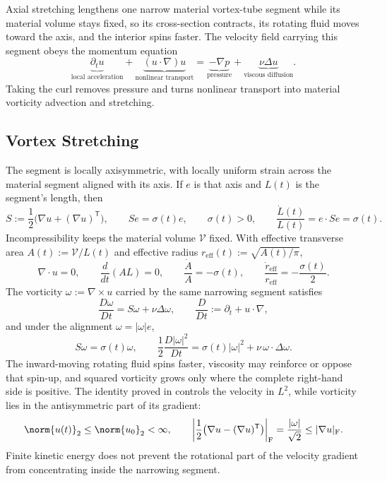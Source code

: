 
Axial stretching lengthens one narrow material vortex-tube segment while its material volume stays fixed, so its cross-section contracts, its rotating fluid moves toward the axis, and the interior spins faster. The velocity field carrying this segment obeys the momentum equation
\[
  \underbrace{\partial_t u}_{\text{local acceleration}}
  +
  \underbrace{(u\cdot\nabla)u}_{\text{nonlinear transport}}
  =
  \underbrace{-\nabla p}_{\text{pressure}}
  +
  \underbrace{\nu\Delta u}_{\text{viscous diffusion}}.
\]
Taking the curl removes pressure and turns nonlinear transport into material vorticity advection and stretching.

\subsection{Vortex Stretching}\label{sub:ThePerfectlyStretchingVortex}

The segment is locally axisymmetric, with locally uniform strain across the material segment aligned with its axis. If \(e\) is that axis and \(L(t)\) is the segment's length, then
\[
  S:=\frac12\bigl(\nabla u+(\nabla u)^{\mathsf T}\bigr),
  \qquad
  Se=\sigma(t)e,
  \qquad
  \sigma(t)>0,
  \qquad
  \frac{\dot L(t)}{L(t)}
  =
  e\cdot Se
  =
  \sigma(t).
\]
Incompressibility keeps the material volume \(\mathcal V\) fixed. With effective transverse area \(A(t):=\mathcal V/L(t)\) and effective radius \(r_{\mathrm{eff}}(t):=\sqrt{A(t)/\pi}\),
\[
  \nabla\cdot u=0,
  \qquad
  \frac{d}{dt}(A L)=0,
  \qquad
  \frac{\dot A}{A}=-\sigma(t),
  \qquad
  \frac{\dot r_{\mathrm{eff}}}{r_{\mathrm{eff}}}
  =
  -\frac{\sigma(t)}{2}.
\]
The vorticity \(\omega:=\nabla\times u\) carried by the same narrowing segment satisfies
\[
  \frac{D\omega}{Dt}
  =
  S\omega+\nu\Delta\omega,
  \qquad
  \frac{D}{Dt}
  :=
  \partial_t+u\cdot\nabla,
\]
and under the alignment \(\omega=|\omega|e\),
\[
  S\omega
  =
  \sigma(t)\omega,
  \qquad
  \frac12\frac{D|\omega|^2}{Dt}
  =
  \sigma(t)|\omega|^2
  +
  \nu\,\omega\cdot\Delta\omega.
\]
The inward-moving rotating fluid spins faster, viscosity may reinforce or oppose that spin-up, and squared vorticity grows only where the complete right-hand side is positive. The identity proved in  controls the velocity in \(L^2\), while vorticity lies in the antisymmetric part of its gradient:
\[
  \norm{u(t)}_2
  \leq
  \norm{u_0}_2
  <\infty,
  \qquad
  \left|\frac12\bigl(\nabla u-(\nabla u)^{\mathsf T}\bigr)\right|_{\mathrm F}
  =
  \frac{|\omega|}{\sqrt2}
  \leq
  |\nabla u|_{\mathrm F}.
\]
Finite kinetic energy does not prevent the rotational part of the velocity gradient from concentrating inside the narrowing segment.

